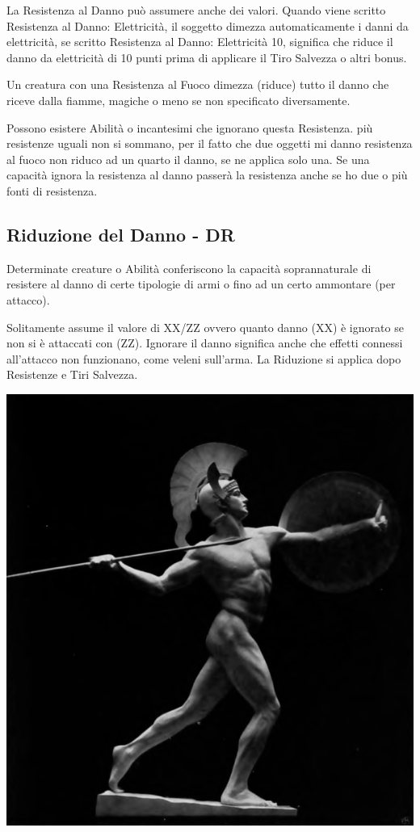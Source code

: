 \begin{multicols}{2}
La Resistenza al Danno può assumere anche dei valori. Quando viene scritto Resistenza al Danno: Elettricità, il soggetto dimezza automaticamente i danni da elettricità, se scritto Resistenza al Danno: Elettricità 10, significa che riduce il danno da elettricità di 10 punti prima di applicare il Tiro Salvezza o altri bonus.

Un creatura con una Resistenza al Fuoco dimezza (riduce) tutto il danno che riceve dalla fiamme, magiche o meno se non specificato diversamente.

Possono esistere Abilità o incantesimi che ignorano questa Resistenza. più resistenze uguali non si sommano, per il fatto che due oggetti mi danno resistenza al fuoco non riduco ad un quarto il danno, se ne applica solo una.
Se una capacità ignora la resistenza al danno passerà la resistenza anche se ho due o più fonti di resistenza.

\subsection{Riduzione del Danno - DR}\label{resistenzaaldannodr}\hypertarget{riduzionedeldanno}{}

Determinate creature o Abilità conferiscono la capacità soprannaturale di resistere al danno di certe tipologie di armi o fino ad un certo ammontare (per attacco).

Solitamente assume il valore di XX/ZZ ovvero quanto danno (XX) è ignorato se non si è attaccati con (ZZ). Ignorare il danno significa anche che effetti connessi all'attacco non funzionano, come veleni sull'arma. La Riduzione si applica dopo Resistenze e Tiri Salvezza.

\begin{center}

\includegraphics[width=0.8\linewidth]{immagini/Archilles_Wilhelm_Wandschneider_grayscale.png}


\end{center}
\end{multicols}
